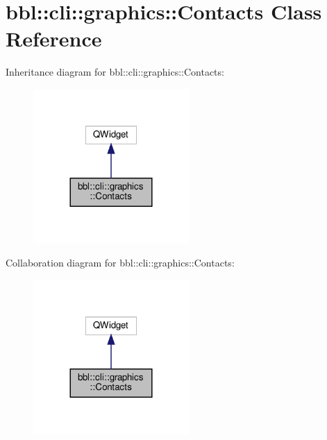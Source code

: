 \hypertarget{classbbl_1_1cli_1_1graphics_1_1_contacts}{}\section{bbl\+:\+:cli\+:\+:graphics\+:\+:Contacts Class Reference}
\label{classbbl_1_1cli_1_1graphics_1_1_contacts}


Inheritance diagram for bbl\+:\+:cli\+:\+:graphics\+:\+:Contacts\+:
\nopagebreak
\begin{figure}[H]
\begin{center}
\leavevmode
\includegraphics[width=168pt]{classbbl_1_1cli_1_1graphics_1_1_contacts__inherit__graph}
\end{center}
\end{figure}


Collaboration diagram for bbl\+:\+:cli\+:\+:graphics\+:\+:Contacts\+:
\nopagebreak
\begin{figure}[H]
\begin{center}
\leavevmode
\includegraphics[width=168pt]{classbbl_1_1cli_1_1graphics_1_1_contacts__coll__graph}
\end{center}
\end{figure}
